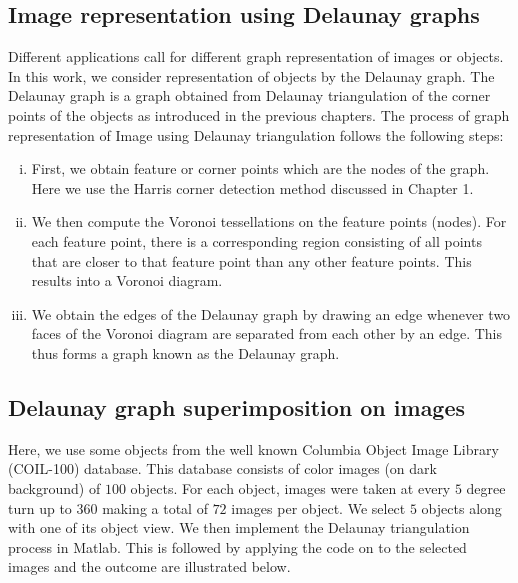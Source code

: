 \documentclass[10pt,a4paper]{article}
\theoremstyle{plain}
\theoremstyle{definition}
\begin{document}
 \subsection{Image representation using Delaunay graphs} 
 Different applications call for different graph representation of images or objects. In this work, we consider representation of objects by the Delaunay graph. The Delaunay graph is a graph obtained from Delaunay triangulation of the corner points of the objects as introduced in the previous chapters. The process of graph representation of Image using Delaunay triangulation follows the following steps:
 \begin{enumerate}[i)]
 	\item First, we obtain feature or corner points which are the nodes of the graph. Here we use the Harris corner detection method discussed in Chapter 1.
 	\item  We then compute the Voronoi tessellations on the feature points (nodes). For each feature point, there is a corresponding region consisting of all points that are closer to that feature point than any other feature points. This results into a Voronoi diagram.
 	\item We obtain the edges of the Delaunay graph by drawing an edge whenever two faces of the Voronoi diagram are separated from each other by an edge. This thus forms a graph known as the Delaunay graph.
 \end{enumerate}
 
 \subsection{Delaunay graph superimposition on images }
 Here, we use some objects from the well known Columbia Object Image Library (COIL-100) database. This database consists of color images (on dark background) of $100$ objects. For each object, images were taken at every $5$ degree turn up to $360$ making a total of $72$ images per object. 
 We select $5$ objects along with one of its object view. We then implement the Delaunay triangulation process in Matlab. This is followed by applying the code on to the selected images and the outcome are illustrated below.
 
\end{document}
